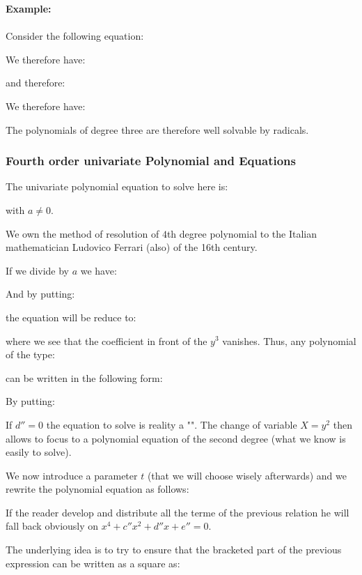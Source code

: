 	\pagebreak
	\begin{tcolorbox}[colframe=black,colback=white,sharp corners]
	\textbf{{\Large {}}Example:}\\\\
	Consider the following equation:
	
	We therefore have:
	
	and therefore:
	
	We therefore have:
	
	\end{tcolorbox}
	The polynomials of degree three are therefore well solvable by radicals.
	
	\subsubsection{Fourth order univariate Polynomial and Equations}
	The univariate polynomial equation to solve here is:
	
	with $a\neq 0$.
	\begin{tcolorbox}[title=Remark,colframe=black,arc=10pt]
	We own the method of resolution of $4$th degree polynomial to the Italian mathematician  Ludovico Ferrari (also) of the 16th century.
	\end{tcolorbox}
	If we divide by $a$ we have:
	
	And by putting:
	
	the equation will be reduce to:
	
	where we see that the coefficient in front of the $y^3$ vanishes. Thus, any polynomial of the type:
	
	can be written in the following form:
	
	By putting:
	
	\begin{tcolorbox}[title=Remark,colframe=black,arc=10pt]
	If $d''=0$ the equation to solve is reality a "". The change of variable $X=y^2$ then allows to focus to a polynomial equation of the second degree (what we know is easily to solve).
	\end{tcolorbox}
	We now introduce a parameter $t$ (that we will choose wisely afterwards) and we rewrite the polynomial equation as follows:
	
	\begin{tcolorbox}[title=Remark,colframe=black,arc=10pt]
	If the reader develop and distribute all the terme of the previous relation he will fall back obviously on $x^4+c''x^2+d''x+e''=0$.
	\end{tcolorbox}
	The underlying idea is to try to ensure that the bracketed part of the previous expression can be written as a square as:
	
